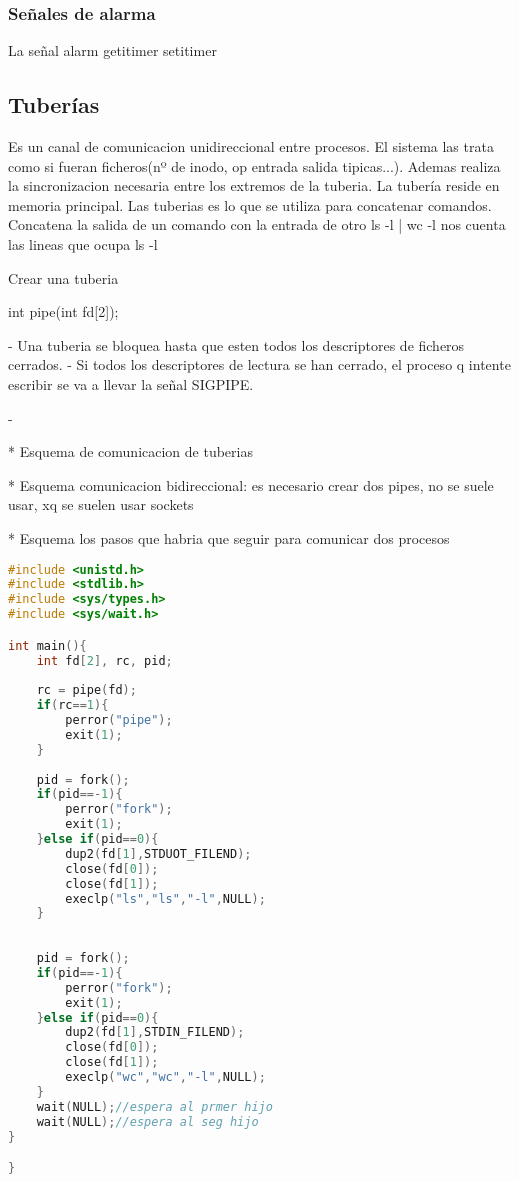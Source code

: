 \subsubsection{Señales de alarma}
La señal alarm
getitimer
setitimer
\subsection{Tuberías}
Es un canal de comunicacion unidireccional entre procesos. El sistema las trata como si fueran ficheros(nº de inodo, op entrada salida tipicas...). Ademas realiza la sincronizacion necesaria entre los extremos de la tuberia. La tubería reside en memoria principal. Las tuberias es lo que se utiliza para concatenar comandos. Concatena la salida de un comando con la entrada de otro
ls -l | wc -l nos cuenta las lineas que ocupa ls -l

Crear una tuberia

int pipe(int fd[2]);

- Una tuberia se bloquea hasta que esten todos los descriptores de ficheros cerrados.
- Si todos los descriptores de lectura se han cerrado, el proceso q intente escribir se va a llevar la señal SIGPIPE.

- 

* Esquema de comunicacion de tuberias

* Esquema comunicacion bidireccional: es necesario crear dos pipes, no se suele usar, xq se suelen usar sockets

* Esquema los pasos que habria que seguir para comunicar dos procesos

\begin{lstlisting}[language=C++]
#include <unistd.h>
#include <stdlib.h>
#include <sys/types.h>
#include <sys/wait.h>

int main(){
    int fd[2], rc, pid;
    
    rc = pipe(fd);
    if(rc==1){
        perror("pipe");
        exit(1);
    }
    
    pid = fork();
    if(pid==-1){
        perror("fork");
        exit(1);
    }else if(pid==0){
        dup2(fd[1],STDUOT_FILEND);
        close(fd[0]);
        close(fd[1]);
        execlp("ls","ls","-l",NULL);
    }
    
    
    pid = fork();
    if(pid==-1){
        perror("fork");
        exit(1);
    }else if(pid==0){
        dup2(fd[1],STDIN_FILEND);
        close(fd[0]);
        close(fd[1]);
        execlp("wc","wc","-l",NULL);
    }
    wait(NULL);//espera al prmer hijo
    wait(NULL);//espera al seg hijo
}

}
\end{lstlisting}
